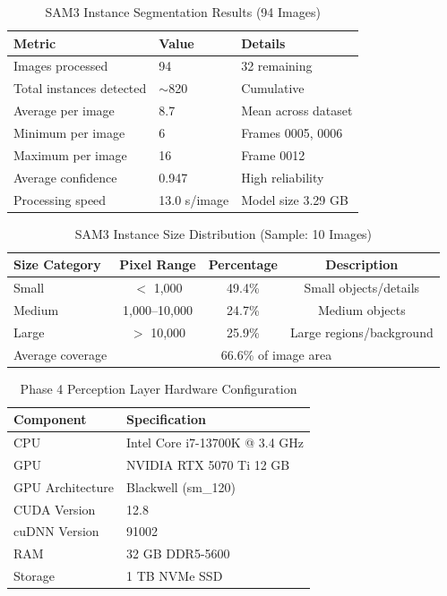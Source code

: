 \begin{table}[htbp]
\centering
\caption{SAM3 Instance Segmentation Results (94 Images)}
\label{tab:sam3_results}
\begin{tabular}{@{}lll@{}}
\toprule
\textbf{Metric} & \textbf{Value} & \textbf{Details} \\
\midrule
Images processed & 94 & 32 remaining \\
Total instances detected & $\sim$820 & Cumulative \\
Average per image & 8.7 & Mean across dataset \\
Minimum per image & 6 & Frames 0005, 0006 \\
Maximum per image & 16 & Frame 0012 \\
Average confidence & 0.947 & High reliability \\
Processing speed & 13.0 s/image & Model size 3.29 GB \\
\bottomrule
\end{tabular}
\end{table}

\begin{table}[htbp]
\centering
\caption{SAM3 Instance Size Distribution (Sample: 10 Images)}
\label{tab:sam3_size_distribution}
\begin{tabular}{@{}lccc@{}}
\toprule
\textbf{Size Category} & \textbf{Pixel Range} & \textbf{Percentage} & \textbf{Description} \\
\midrule
Small & $<$ 1,000 & 49.4\% & Small objects/details \\
Medium & 1,000--10,000 & 24.7\% & Medium objects \\
Large & $>$ 10,000 & 25.9\% & Large regions/background \\
\midrule
Average coverage & \multicolumn{3}{c}{66.6\% of image area} \\
\bottomrule
\end{tabular}
\end{table}

\begin{table}[htbp]
\centering
\caption{Phase 4 Perception Layer Hardware Configuration}
\label{tab:phase4_hardware}
\begin{tabular}{@{}ll@{}}
\toprule
\textbf{Component} & \textbf{Specification} \\
\midrule
CPU & Intel Core i7-13700K @ 3.4 GHz \\
GPU & NVIDIA RTX 5070 Ti 12 GB \\
GPU Architecture & Blackwell (sm\_120) \\
CUDA Version & 12.8 \\
cuDNN Version & 91002 \\
RAM & 32 GB DDR5-5600 \\
Storage & 1 TB NVMe SSD \\
\bottomrule
\end{tabular}
\end{table}

